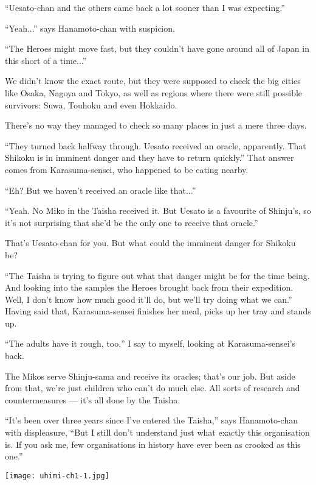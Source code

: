 ``Uesato-chan and the others came back a lot sooner than I was expecting.''

``Yeah...'' says Hanamoto-chan with suspicion.

``The Heroes might move fast, but they couldn't have gone around all of Japan in this short of a time...''

We didn't know the exact route, but they were supposed to check the big cities like Osaka, Nagoya and Tokyo, as well as regions where there were still possible survivors: Suwa, Touhoku and even Hokkaido.

There's no way they managed to check so many places in just a mere three days.

``They turned back halfway through. Uesato received an oracle, apparently. That Shikoku is in imminent danger and they have to return quickly.''  That answer comes from Karasuma-sensei, who happened to be eating nearby.

``Eh? But we haven't received an oracle like that...''

``Yeah. No Miko in the Taisha received it. But Uesato is a favourite of Shinju's, so it's not surprising that she'd be the only one to receive that oracle.''

That's Uesato-chan for you. But what could the imminent danger for Shikoku be?

``The Taisha is trying to figure out what that danger might be for the time being. And looking into the samples the Heroes brought back from their expedition. Well, I don't know how much good it'll do, but we'll try doing what we can.''  Having said that, Karasuma-sensei finishes her meal, picks up her tray and stands up.

``The adults have it rough, too,'' I say to myself, looking at Karasuma-sensei's back.

The Mikos serve Shinju-sama and receive its oracles; that's our job. But aside from that, we're just children who can't do much else. All sorts of research and countermeasures --- it's all done by the Taisha.

``It's been over three years since I've entered the Taisha,'' says Hanamoto-chan with displeasure, ``But I still don't understand just what exactly this organisation is. If you ask me, few organisations in history have ever been as crooked as this one.''

\newpage
\thispagestyle{empty}
\texttt{[image: uhimi-ch1-1.jpg]}

